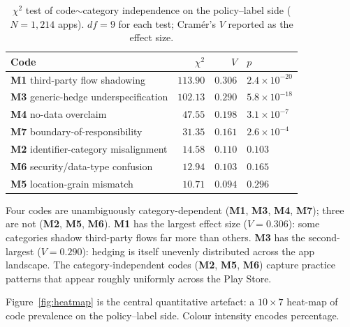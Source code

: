 \documentclass[11pt,a4paper]{article}
\newcommand{\code}[1]{\textsf{\textbf{#1}}}
\begin{document}
\begin{table}[t]
\centering\small
\caption{$\chi^2$ test of code$\sim$category independence on the
policy--label side ($N=1{,}214$ apps). $df=9$ for each test;
Cram\'er's $V$ reported as the effect size.}
\label{tab:chi}
\begin{tabular}{lrrl}
\toprule
\textbf{Code} & $\chi^2$ & $V$ & $p$ \\
\midrule
\code{M1} third-party flow shadowing       & $113.90$ & $0.306$ & $2.4\!\times\!10^{-20}$ \\
\code{M3} generic-hedge underspecification & $102.13$ & $0.290$ & $5.8\!\times\!10^{-18}$ \\
\code{M4} no-data overclaim                & $47.55$  & $0.198$ & $3.1\!\times\!10^{-7}$  \\
\code{M7} boundary-of-responsibility       & $31.35$  & $0.161$ & $2.6\!\times\!10^{-4}$  \\
\code{M2} identifier-category misalignment & $14.58$  & $0.110$ & $0.103$                 \\
\code{M6} security/data-type confusion     & $12.94$  & $0.103$ & $0.165$                 \\
\code{M5} location-grain mismatch          & $10.71$  & $0.094$ & $0.296$                 \\
\bottomrule
\end{tabular}
\end{table}

Four codes are unambiguously category-dependent (\code{M1}, \code{M3},
\code{M4}, \code{M7}); three are not (\code{M2}, \code{M5},
\code{M6}). \code{M1} has the largest effect size ($V=0.306$): some
categories shadow third-party flows far more than others. \code{M3}
has the second-largest ($V=0.290$): hedging is itself unevenly
distributed across the app landscape. The category-independent codes
(\code{M2}, \code{M5}, \code{M6}) capture practice patterns that
appear roughly uniformly across the Play Store.

Figure~\ref{fig:heatmap} is the central
quantitative artefact: a $10\!\times\!7$ heat-map of code prevalence
on the policy--label side. Colour intensity encodes percentage.
\end{document}
